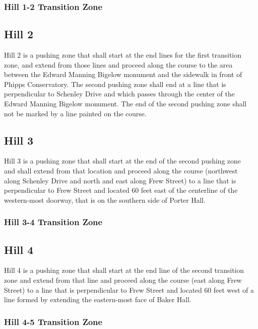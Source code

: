 \subsubsection{Hill 1-2 Transition Zone} 


\subsection{Hill 2}

	Hill 2 is a pushing zone that shall start at the end lines for the first transition zone, and extend from those lines and proceed along the course to the area between the Edward Manning Bigelow monument and the sidewalk in front of Phipps Conservatory. The second pushing zone shall end at a line that is perpendicular to Schenley Drive and which passes through the center of the Edward Manning Bigelow monument. The end of the second pushing zone shall not be marked by a line painted on the course.

\subsection{Hill 3}

	Hill 3 is a pushing zone that shall start at the end of the second pushing zone and shall extend from that location and proceed along the course (northwest along Schenley Drive and north and east along Frew Street) to a line that is perpendicular to Frew Street and located 60 feet east of the centerline of the western-most doorway, that is on the southern side of Porter Hall.

\subsubsection{Hill 3-4 Transition Zone} 


\subsection{Hill 4}

	Hill 4 is a pushing zone that shall start at the end line of the second transition zone and extend from that line and proceed along the course (east along Frew Street) to a line that is perpendicular to Frew Street and located 60 feet west of a line formed by extending the eastern-most face of Baker Hall.

\subsubsection{Hill 4-5 Transition Zone} 

